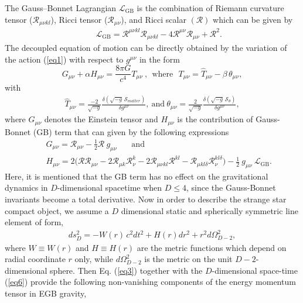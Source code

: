 \documentclass[]{aastex631}
\begin{document}
The Gauss--Bonnet 
Lagrangian $\mathcal{L}_{\text{GB}}$ is the combination of Riemann curvature tensor ($\mathcal{R}_{\mu\nu kl}$), Ricci tensor ($\mathcal{R}_{\mu\nu}$), and Ricci scalar $(\mathcal{R})$ which can be given by
\begin{eqnarray}
&& \mathcal{L}_{\text{GB}}=\mathcal{R}^{\mu\nu kl} \mathcal{R}_{\mu\nu kl}- 4 \mathcal{R}^{\mu\nu}\mathcal{R}_{\mu\nu}+ \mathcal{R}^2\label{GB}.  \label{eq2}
\end{eqnarray}
The decoupled equation of motion can be directly obtained by the variation of the action  (\ref{eq1}) with respect to $g^{\mu\nu}$ in the form 
\begin{equation}\label{eq3}
G_{\mu\nu}+\alpha H_{\mu\nu} = \frac{8 \pi G }{c^4} T_{\mu\nu}~,~~\mbox{where}~~~T_{\mu\nu}= \hat{T}_{\mu\nu}-\beta\,\theta_{\mu\nu},
\end{equation}
with
\begin{eqnarray}
\hat{T}_{\mu\nu}=\frac{-2}{\sqrt{-g}}\frac{\delta\left(\sqrt{-g}\,\mathcal{S}_{matter}\right)}{\delta g^{\mu\nu}},~\text{and}~\theta_{\mu\nu}=\frac{2}{\sqrt{-g}}\frac{\delta\left(\sqrt{-g}\,\mathcal{S}_\theta\right)}{\delta g^{\mu\nu}},  \label{eq4}
\end{eqnarray}
where $G_{\mu\nu}$ denotes the Einstein tensor and $H_{\mu\nu}$ is the contribution of Gauss-Bonnet (GB) term that can given by the following expressions
\begin{eqnarray}
 && G_{\mu\nu} = \mathcal{R}_{\mu\nu}-\frac{1}{2}\mathcal{R}~ g_{\mu\nu} ~~~~~~~~\text{and}~~ \nonumber\\
&& H_{\mu\nu} =  2\Big( \mathcal{R} \mathcal{R}_{\mu\nu}-2\mathcal{R}_{\mu k} \mathcal{R}^k_\nu -2 \mathcal{R}_{\mu\nu kl}\mathcal{R}^{kl} - \mathcal{R}_{\mu kl\delta} \mathcal{R}^{kl\delta}_\nu\Big)- \frac{1}{2}~g_{\mu\nu}~\mathcal{L}_{\text{GB}}.  \label{eq5}
\end{eqnarray}
Here, it is mentioned that the GB term has no effect on the gravitational dynamics in $D$-dimensional spacetime when $D\le4$, since the Gauss-Bonnet invariants become a total derivative. Now in order to describe the strange star compact object, we assume a $D$ dimensional static and spherically symmetric line element of form,
\begin{eqnarray}\label{eq6}
ds^2_{D}= - W(r)\, c^2dt^2 + H (r) dr^2 + r^{2} d\Omega^2_{D-2},
\end{eqnarray}
where  $W\equiv W(r)$ and $H\equiv H(r)$ are the metric functions which depend on radial coordinate $r$ only, while  $d\Omega^2_{D-2}$ is the metric on the unit $D-2$- dimensional sphere. Then  Eq. (\ref{eq3}) together with the $D$-dimensional space-time (\ref{eq6}) provide the following non-vanishing components of the energy momentum tensor in  EGB gravity,
\end{document}
